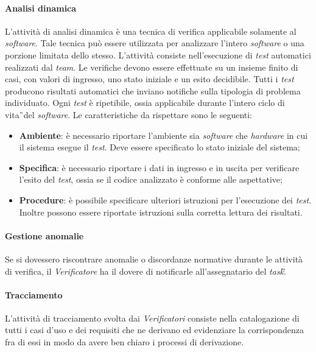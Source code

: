 \paragraph{Analisi dinamica}
L'attività di analisi dinamica è una tecnica di verifica applicabile solamente al \textit{software}. Tale tecnica può essere utilizzata per analizzare l'intero \textit{software} o una porzione limitata dello stesso. L'attività consiste nell'esecuzione di \textit{test} automatici realizzati dal \textit{team}. Le verifiche devono essere effettuate su un insieme finito di casi, con valori di ingresso, uno stato iniziale e un esito decidibile. Tutti i \textit{test} producono risultati automatici che inviano notifiche sulla tipologia di problema individuato. Ogni \textit{test} è ripetibile, ossia applicabile durante l'intero ciclo di vita\G\ del \textit{software}. Le caratteristiche da rispettare sono le seguenti: 
\begin{itemize}
	\item \textbf{Ambiente}: è necessario riportare l'ambiente sia \textit{software} che \textit{hardware} in cui il sistema esegue il \textit{test}. Deve essere specificato lo stato iniziale del sistema; 
	\item \textbf{Specifica}: è necessario riportare i dati in ingresso e in uscita per verificare l'esito del \textit{test}, ossia se il codice analizzato è conforme alle aspettative;
	\item \textbf{Procedure}: è possibile specificare ulteriori istruzioni per l'esecuzione dei \textit{test}. Inoltre possono essere riportate istruzioni sulla corretta lettura dei risultati.
\end{itemize}
\paragraph{Gestione anomalie}
Se si dovessero riscontrare anomalie o discordanze normative durante le attività di verifica, il \textit{Verificatore} ha il dovere di notificarle all'assegnatario del \textit{task}\G.  

\paragraph{Tracciamento}
L'attività di tracciamento svolta dai \textit{Verificatori} consiste nella catalogazione di tutti i casi d'uso e dei requisiti che ne derivano ed evidenziare la corrispondenza fra di essi in modo da avere ben chiaro i processi di derivazione.

